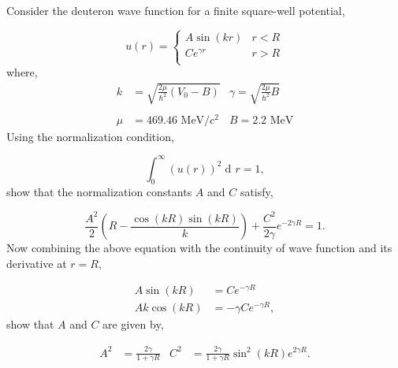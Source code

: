\documentclass[12pt]{article}
\newcommand*{\titleGM}{\begingroup %
\hbox{ %
\hspace*{0.2\textwidth} %
\rule{1pt}{\textheight} %
\hspace*{0.05\textwidth} %
\parbox[b]{0.75\textwidth}{ %

{\noindent\Huge\bfseries The Story of the Deuteron}\\[2\baselineskip] %
{\large \textit{PHYS 473: Assignment 1}}\\[4\baselineskip]
{\large \textsc{ Kevin Multani }} %

\vspace{0.5\textheight} %
{\noindent \today }\\[\baselineskip]
{\noindent Student Number: 33542127 }\\[\baselineskip] 
{\noindent \footnotesize All problems below are \textit{Copyright \copyright \space 2018 Javed Iqbal. All Rights Reserved.} }\\[\baselineskip]
	}
}
\endgroup}
\renewcommand{\=}[1]{\stackrel{#1}{=}} %
\DeclareMathOperator{\di}{d\!}
\newenvironment{problem}[2][Problem]{\begin{trivlist}
\item[\hskip \labelsep {\bfseries #1}\hskip \labelsep {\bfseries #2.}]}{\end{trivlist}}
\begin{document}
    \begin{titlingpage}
		\titleGM
	\end{titlingpage}
	\clearpage
	\setcounter{page}{1}


	\begin{problem}{1} 
        Consider the deuteron wave function for a finite square-well potential, 
        
        $$
        u(r)=
        \begin{cases}
            A\sin(kr) & r < R\\
            Ce^{\gamma r} & r > R\\
        \end{cases}
        $$
        where,
        \begin{align*}
            k &= \sqrt{\frac{2\mu}{\hbar^2}\left(V_0 - B\right)} & \gamma = \sqrt{\frac{2\mu}{\hbar^2}B}\\ & & \\
            \mu &= 469.46 \text{ MeV}/c^2 & B = 2.2 \text{ MeV}
        \end{align*}
	    Using the normalization condition,
	    
	    $$
	    \int_0^\infty \left(u(r)\right)^2 \di r = 1,
	    $$
	    show that the normalization constants $A$ and $C$ satisfy,
	    
	    $$
	    \frac{A^2}{2}\left(R - \frac{\cos(kR)\sin(kR)}{k}\right) + \frac{C^2}{2\gamma}e^{-2\gamma R} = 1.
	    $$
	    Now combining the above equation with the continuity of wave function and its derivative at $r = R$, 
	    
	    \begin{align*}
	        A\sin(kR) &= Ce^{-\gamma R}\\
	        Ak\cos(kR) &= -\gamma Ce^{-\gamma R},
	    \end{align*}
	    show that $A$ and $C$ are given by,
	    
	    \begin{align*}
	        A^2 &= \frac{2\gamma}{1 + \gamma R} & C^2 &= \frac{2\gamma}{1 + \gamma R} \sin^2(kR)e^{2\gamma R}. 
	    \end{align*}
	\end{problem}
\end{document}
